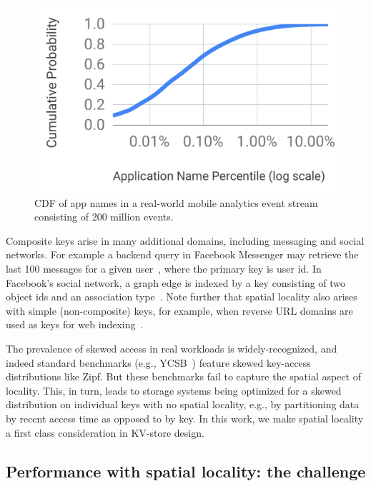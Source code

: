 \begin{figure}[tb]
\centering
\includegraphics[width=0.7\columnwidth]{figs/cdf.pdf}
\caption{CDF of app names in a real-world mobile analytics event stream consisting of 200 million events.}
\label{fig:cdf}
\end{figure}

Composite keys arise in many additional domains, including messaging and social networks. 
For example a backend query in Facebook Messenger may retrieve the last 100 messages for a 
given user~\cite{Borthakur:2011:AHG:1989323.1989438}, where the primary key is user id. 
In Facebook's social network, a graph edge is indexed by a key consisting of two 
object ids and an association type~\cite{Armstrong:2013:LDB:2463676.2465296}.
Note further that spatial locality   also arises with simple (non-composite) keys, for example, when 
reverse  URL domains are used as keys for web  indexing~\cite{Cho:1998:ECT:297805.297835}. 

The prevalence of skewed  access  in real workloads is widely-recognized, 
and indeed standard benchmarks (e.g., YCSB~\cite{YCSB})  feature skewed key-access distributions like Zipf.
But 
these benchmarks fail to capture the spatial aspect of locality.
This, in turn, leads to storage systems being optimized for a skewed distribution on individual keys with no spatial locality,
e.g., by partitioning data by recent access time as opposed to by key.
In this work, we make spatial locality a first class consideration in KV-store design.



\subsection{Performance with spatial locality: the challenge }  

